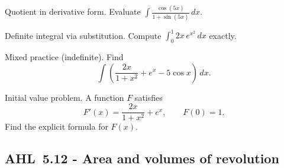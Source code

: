 \documentclass[11pt]{article}
\def\textbf#1{#1}%
\newcommand{\tocsubsection}[1]{\subsection{#1}}
\newcounter{question}
\begin{document}
\begin{question}
\textbf{Quotient in derivative form.}
Evaluate $\displaystyle \int \frac{\cos(5x)}{1+\sin(5x)}\,dx$.
\end{question}

\begin{question}
\textbf{Definite integral via substitution.}
Compute $\displaystyle \int_{0}^{1} 2x\,e^{x^{2}}\,dx$ exactly.
\end{question}

\begin{question}
\textbf{Mixed practice (indefinite).}
Find
\[
\int \left( \frac{2x}{1+x^{2}} + e^{x} - 5\cos x \right)\,dx .
\]
\end{question}

\begin{question}
\textbf{Initial value problem.}
A function $F$ satisfies
\[
F'(x)=\frac{2x}{1+x^{2}}+e^{x},\qquad F(0)=1.
\]
Find the explicit formula for $F(x)$.
\end{question}


\tocsubsection{AHL 5.12 - Area and volumes of revolution}

\end{document}
